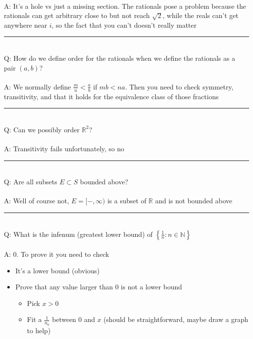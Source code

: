 \documentclass{article}
\newcommand{\R}{\mathbb{R}}
\newcommand{\N}{\mathbb{N}}
\begin{document}
~\\
A: It's a hole vs just a missing section. The rationals pose a problem because the rationals can get arbitrary close to but not reach $\sqrt{2}$, while the reals can't get anywhere near $i$, so the fact that you can't doesn't really matter 
\bigskip
\hrule
\bigskip
~\\
Q: How do we define order for the rationals when we define the rationals as a pair $(a,b)$?~\\
~\\
A: We normally define $\frac{m}{n} < \frac{a}{b}$ if $mb < na$. Then you need to check symmetry, transitivity, and that it holds for the equivalence class of those fractions
\bigskip
\hrule
\bigskip 
~ \\
Q: Can we possibly order $\R^2$? \\
~\\
A: Transitivity fails unfortunately, so no
\bigskip
\hrule
\bigskip ~\\
Q: Are all subsets $E\subset S$ bounded above? \\
~\\
A: Well of course not, $E = [-,\infty)$ is a subset of $\R$ and is not bounded above
\bigskip
\hrule
\bigskip ~\\
Q: What is the infenum (greatest lower bound) of $\left\{ \frac{1}{n} : n\in\N\right\}$ \\
~\\
A: $0$. To prove it you need to check
\begin{itemize}
	\item It's a lower bound (obvious)
	\item Prove that any value larger than $0$ is not a lower bound
	\begin{itemize}
		\item Pick $x>0$
		\item Fit a $\frac{1}{n_0}$ between $0$ and $x$ (should be straightforward, maybe draw a graph to help)
	\end{itemize}
\end{itemize}
\end{document}
